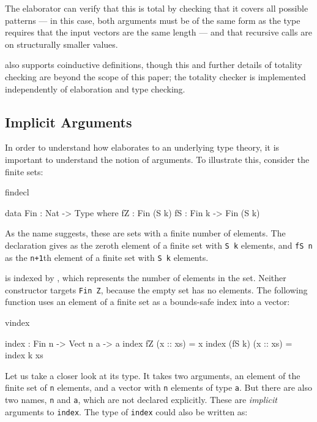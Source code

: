 \noindent
The elaborator can verify that this is total by checking that it covers all
possible patterns --- in this case, both arguments must be of the same form
as the type requires that the input vectors are the same length --- and that
recursive calls are on structurally smaller values. 

\Idris{} also supports coinductive definitions, though this and further
details of totality checking are beyond the scope of this paper; the totality
checker is implemented independently of elaboration and type checking.

\subsection{Implicit Arguments}

In order to understand how \Idris{} elaborates to an underlying type theory,
it is important to understand the notion of  arguments.
To illustrate this, consider the finite sets:

\begin{SaveVerbatim}{findecl}

data Fin : Nat -> Type where
      fZ : Fin (S k)
      fS : Fin k -> Fin (S k)

\end{SaveVerbatim}

\noindent
As the name suggests, these are sets with a finite number of elements.
The declaration gives
 as the zeroth element of a finite set with \texttt{S k} elements,
and \texttt{fS n} as the
\texttt{n+1}th element of a finite set with \texttt{S k} elements. 

 is indexed by , which represents the number of elements in
the set.  Neither constructor targets \texttt{Fin Z}, because the empty
set has no elements. The following function uses an element
of a finite set as a bounds-safe index into a vector:

\begin{SaveVerbatim}{vindex}

index : Fin n -> Vect n a -> a
index fZ     (x :: xs) = x
index (fS k) (x :: xs) = index k xs

\end{SaveVerbatim}

\noindent
Let us take a closer look at its type.
It takes two arguments, an element of the finite set of \texttt{n} elements, and a vector
with \texttt{n} elements of type \texttt{a}. But there are also two names, 
\texttt{n} and \texttt{a}, which are not declared explicitly. These are \emph{implicit}
arguments to \texttt{index}. The type of \texttt{index} could also be written as:

